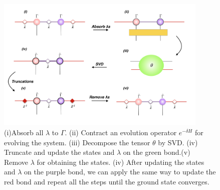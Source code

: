 \begin{figure}[hb]
	\centering
	\includegraphics[width=0.90\textwidth]{figures/fig313.png}
	\caption[The tensor network diagrams for the 1D iTEBD]{ (i)Absorb all $\lambda$ to $\Gamma$. (ii) Contract an evolution operator $e^{-\delta H}$ for evolving the system. (iii) Decompose the tensor $\theta$ by SVD. (iv) Truncate and update the states and $\lambda$ on the green bond.(v) Remove $
		\lambda$ for obtaining the states. (iv) After updating the states and $\lambda$ on the purple bond, we can apply the same way to update the red bond and repeat all the steps until the ground state converges.}
	\label{fig314}
\end{figure}

